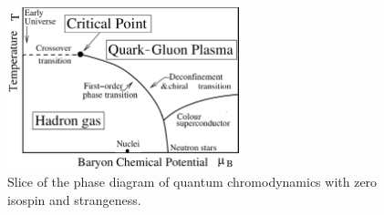 \begin{figure}[t]
\centering
\includegraphics[width=0.6\textwidth]{figures/qcd-phase-diagram.png}
\caption{%
	Slice of the phase diagram of quantum chromodynamics with zero isospin and strangeness.
}
\label{fig:qcd:phase_diagram}
\end{figure}

